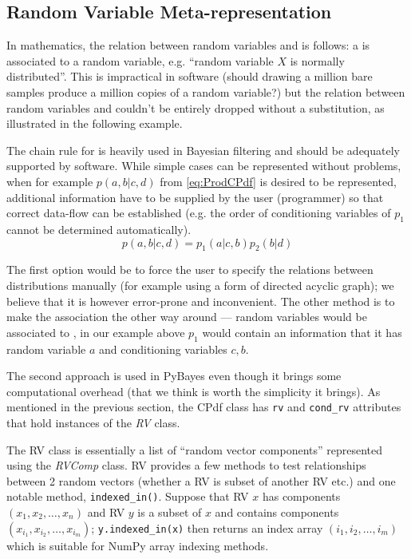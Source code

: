 \subsection{Random Variable Meta-representation}

In mathematics, the relation between random variables and {\pdfs} is follows: a {\pdf} is associated
to a random variable, e.g. ``random variable \(X\) is normally distributed''. This is impractical in
software (should drawing a million bare samples produce a million copies of a random variable?) but
the relation between random variables and {\pdfs} couldn't be entirely dropped without a substitution,
as illustrated in the following example.

The chain rule for {\pdfs} is heavily used in Bayesian filtering and should be adequately supported
by software. While simple cases can be represented without problems, when for example \(p(a,b|c,d)\)
from \eqref{eq:ProdCPdf} is desired to be represented, additional information have to be supplied by
the user (programmer) so that correct data-flow can be established (e.g. the order of conditioning
variables of \(p_1\) cannot be determined automatically).
\begin{equation} \label{eq:ProdCPdf}
	p(a,b|c,d) = p_1(a|c,b) p_2(b|d)
\end{equation}

The first option would be to force the user to specify the relations between distributions manually
(for example using a form of directed acyclic graph); we believe that it is however error-prone
and inconvenient. The other method is to make the association the other way around --- random
variables would be associated to {\pdfs}, in our example above \(p_1\) would contain an information
that it has random variable \(a\) and conditioning variables \(c,b\).

The second approach is used in PyBayes even though it brings some computational overhead (that we
think is worth the simplicity it brings). As mentioned in the previous section, the CPdf class has
\verb|rv| and \verb|cond_rv| attributes that hold instances of the \emph{RV} class.

The RV class is essentially a list of ``random vector components'' represented using the
\emph{RVComp} class. RV provides a few methods to test relationships between 2 random vectors
(whether a RV is subset of another RV etc.) and one notable method, \verb|indexed_in()|. Suppose
that RV \(x\) has components \((x_1, x_2, \dotsc, x_n)\) and RV \(y\) is a subset of \(x\) and contains
components \((x_{i_1}, x_{i_2}, \dotsc, x_{i_m})\); \verb|y.indexed_in(x)| then returns an index array
\((i_1, i_2, \dotsc, i_m)\) which is suitable for NumPy array indexing methods.

